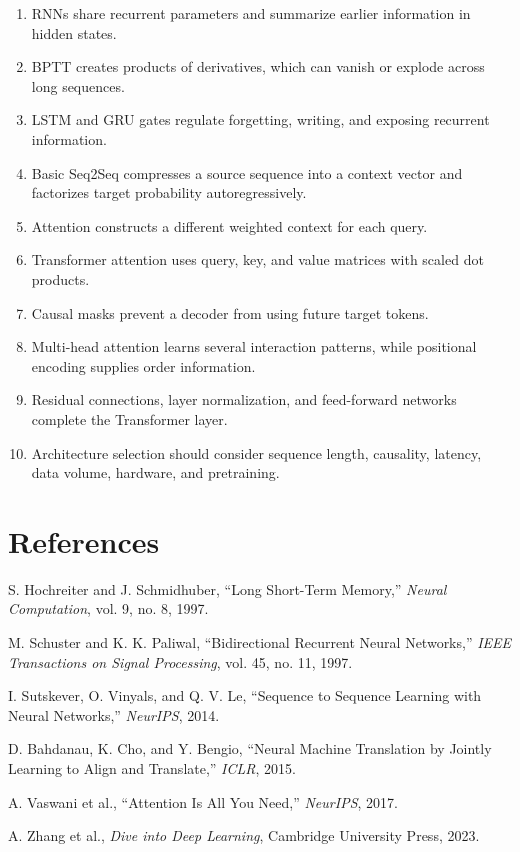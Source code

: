 \documentclass[11pt,a4paper,twoside]{article}
\begin{document}
\begin{enumerate}
  \item RNNs share recurrent parameters and summarize earlier information in hidden states.
  \item BPTT creates products of derivatives, which can vanish or explode across long sequences.
  \item LSTM and GRU gates regulate forgetting, writing, and exposing recurrent information.
  \item Basic Seq2Seq compresses a source sequence into a context vector and factorizes target probability autoregressively.
  \item Attention constructs a different weighted context for each query.
  \item Transformer attention uses query, key, and value matrices with scaled dot products.
  \item Causal masks prevent a decoder from using future target tokens.
  \item Multi-head attention learns several interaction patterns, while positional encoding supplies order information.
  \item Residual connections, layer normalization, and feed-forward networks complete the Transformer layer.
  \item Architecture selection should consider sequence length, causality, latency, data volume, hardware, and pretraining.
\end{enumerate}

\section*{References}

\begin{enumerate}[label={[\arabic*]}]
  \item S. Hochreiter and J. Schmidhuber, ``Long Short-Term Memory,'' \textit{Neural Computation}, vol. 9, no. 8, 1997.
  \item M. Schuster and K. K. Paliwal, ``Bidirectional Recurrent Neural Networks,'' \textit{IEEE Transactions on Signal Processing}, vol. 45, no. 11, 1997.
  \item I. Sutskever, O. Vinyals, and Q. V. Le, ``Sequence to Sequence Learning with Neural Networks,'' \textit{NeurIPS}, 2014.
  \item D. Bahdanau, K. Cho, and Y. Bengio, ``Neural Machine Translation by Jointly Learning to Align and Translate,'' \textit{ICLR}, 2015.
  \item A. Vaswani et al., ``Attention Is All You Need,'' \textit{NeurIPS}, 2017.
  \item A. Zhang et al., \textit{Dive into Deep Learning}, Cambridge University Press, 2023.
\end{enumerate}
\end{document}
